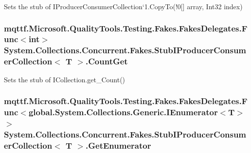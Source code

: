 Sets the stub of I\-Producer\-Consumer\-Collection`1.Copy\-To(!0\mbox{[}\mbox{]} array, Int32 index)

\hypertarget{class_system_1_1_collections_1_1_concurrent_1_1_fakes_1_1_stub_i_producer_consumer_collection_3_01_t_01_4_af7753362601c95efce5ea9a1d22d521d}{
\subsubsection[{Count\-Get}]{\setlength{\rightskip}{0pt plus 5cm}mqttf.\-Microsoft.\-Quality\-Tools.\-Testing.\-Fakes.\-Fakes\-Delegates.\-Func$<$int$>$ System.\-Collections.\-Concurrent.\-Fakes.\-Stub\-I\-Producer\-Consumer\-Collection$<$ T $>$.Count\-Get}}\label{class_system_1_1_collections_1_1_concurrent_1_1_fakes_1_1_stub_i_producer_consumer_collection_3_01_t_01_4_af7753362601c95efce5ea9a1d22d521d}


Sets the stub of I\-Collection.\-get\-\_\-\-Count()

\hypertarget{class_system_1_1_collections_1_1_concurrent_1_1_fakes_1_1_stub_i_producer_consumer_collection_3_01_t_01_4_aa39b3ed5fc7a650187c74f059a362136}{
\subsubsection[{Get\-Enumerator}]{\setlength{\rightskip}{0pt plus 5cm}mqttf.\-Microsoft.\-Quality\-Tools.\-Testing.\-Fakes.\-Fakes\-Delegates.\-Func$<$global.\-System.\-Collections.\-Generic.\-I\-Enumerator$<$T$>$ $>$ System.\-Collections.\-Concurrent.\-Fakes.\-Stub\-I\-Producer\-Consumer\-Collection$<$ T $>$.Get\-Enumerator}}\label{class_system_1_1_collections_1_1_concurrent_1_1_fakes_1_1_stub_i_producer_consumer_collection_3_01_t_01_4_aa39b3ed5fc7a650187c74f059a362136}


